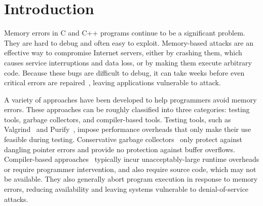 \documentclass{acm_proc_article-sp}
\begin{document}



\section{Introduction}
\label{sec:intro}

\noindent
Memory errors in C and C++ programs continue to be a significant
problem. They are hard to debug and often easy to
exploit. Memory-based attacks are an effective way to compromise
Internet servers, either by crashing them, which causes service
interruptions and data loss, or by making them execute arbitrary
code. Because these bugs are difficult to debug, it can take weeks
before even critical errors are repaired~\cite{symantec}, leaving
applications vulnerable to attack.
 
A variety of approaches have been developed to help programmers avoid
memory errors. These approaches can be roughly classified into three
categories: testing tools, garbage collectors, and compiler-based
tools. Testing tools, such as
Valgrind~\cite{Net:bounds-checking2004,Sew:memcheck2005} and
Purify~\cite{Hastings:91}, impose performance overheads that only make
their use feasible during testing. Conservative garbage
collectors~\cite{boeh88} only protect against dangling pointer errors
and provide no protection against buffer overflows. Compiler-based
approaches~\cite{178446,1062520,da06icse,1133999,713871,503286,cred,1029913,940113}
typically incur unacceptably-large runtime overheads or require
programmer intervention, and also require source code, which may not
be available. They also generally abort program execution in response
to memory errors, reducing availability and leaving systems vulnerable
to denial-of-service attacks.

%
 
\end{document}
